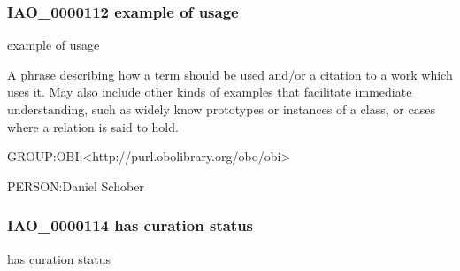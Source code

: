 \documentclass[letterpaper,10pt,english]{sphinxmanual}
\begin{document}
\subsubsection{IAO\_0000112 \sphinxhyphen{} example of usage}
\label{\detokenize{doc-IAO_0000112:iao-0000112-example-of-usage}}\label{\detokenize{doc-IAO_0000112:index-0}}\label{\detokenize{doc-IAO_0000112::doc}}
\begin{sphinxShadowBox}

\sphinxAtStartPar
example of usage
\end{sphinxShadowBox}

\begin{sphinxShadowBox}

\sphinxAtStartPar
A phrase describing how a term should be used and/or a citation to a work which uses it. May also include other kinds of examples that facilitate immediate understanding, such as widely know prototypes or instances of a class, or cases where a relation is said to hold.
\end{sphinxShadowBox}

\begin{sphinxShadowBox}

\sphinxAtStartPar
GROUP:OBI:\textless{}http://purl.obolibrary.org/obo/obi\textgreater{}
\end{sphinxShadowBox}

\begin{sphinxShadowBox}

\sphinxAtStartPar
PERSON:Daniel Schober
\end{sphinxShadowBox}
\begin{quote}

\ignorespaces \end{quote}


\subsubsection{IAO\_0000114 \sphinxhyphen{} has curation status}
\label{\detokenize{doc-IAO_0000114:iao-0000114-has-curation-status}}\label{\detokenize{doc-IAO_0000114:index-0}}\label{\detokenize{doc-IAO_0000114::doc}}
\begin{sphinxShadowBox}

\sphinxAtStartPar
has curation status
\end{sphinxShadowBox}
\end{document}

